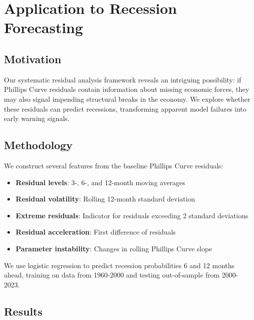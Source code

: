 \documentclass[12pt]{article}
\begin{document}
\section{Application to Recession Forecasting}

\subsection{Motivation}

Our systematic residual analysis framework reveals an intriguing possibility: if Phillips Curve residuals contain information about missing economic forces, they may also signal impending structural breaks in the economy. We explore whether these residuals can predict recessions, transforming apparent model failures into early warning signals.

\subsection{Methodology}

We construct several features from the baseline Phillips Curve residuals:

\begin{itemize}
    \item \textbf{Residual levels}: 3-, 6-, and 12-month moving averages
    \item \textbf{Residual volatility}: Rolling 12-month standard deviation
    \item \textbf{Extreme residuals}: Indicator for residuals exceeding 2 standard deviations
    \item \textbf{Residual acceleration}: First difference of residuals
    \item \textbf{Parameter instability}: Changes in rolling Phillips Curve slope
\end{itemize}

We use logistic regression to predict recession probabilities 6 and 12 months ahead, training on data from 1960-2000 and testing out-of-sample from 2000-2023.

\subsection{Results}
\end{document}
